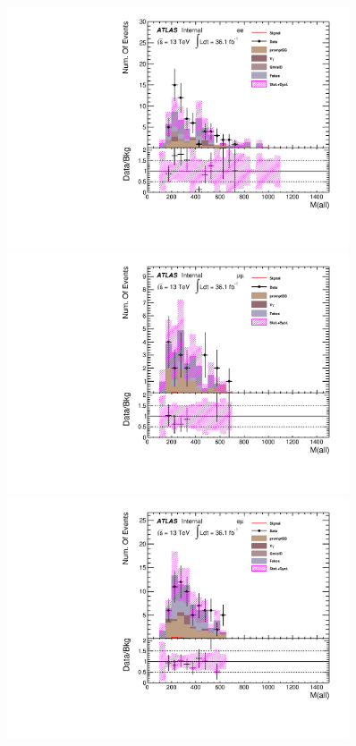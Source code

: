 \begin{figure}[h]
\begin{minipage}[t]{0.33\linewidth}
 \centering
 \includegraphics[width=0.9\textwidth,angle=-90]{fig/SigOpt/mH260_m_all_ee.pdf}
 \end{minipage}
 \begin{minipage}[t]{0.33\linewidth}
 \centering
 \includegraphics[width=0.9\textwidth,angle=-90]{fig/SigOpt/mH260_m_all_mumu.pdf}
 \end{minipage}
 \begin{minipage}[t]{0.33\linewidth}
 \centering
 \includegraphics[width=0.9\textwidth,angle=-90]{fig/SigOpt/mH260_m_all_emu.pdf}

\end{minipage}
\end{figure}
